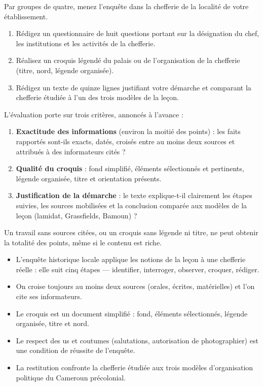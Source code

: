 \documentclass[11pt]{article}
\begin{document}
\begin{exercice}
Par groupes de quatre, menez l'enquête dans la chefferie de la localité de votre établissement.
\begin{enumerate}
\item Rédigez un questionnaire de huit questions portant sur la désignation du chef, les institutions et les activités de la chefferie.
\item Réalisez un croquis légendé du palais ou de l'organisation de la chefferie (titre, nord, légende organisée).
\item Rédigez un texte de quinze lignes justifiant votre démarche et comparant la chefferie étudiée à l'un des trois modèles de la leçon.
\end{enumerate}
\end{exercice}

\begin{corrige}
L'évaluation porte sur trois critères, annoncés à l'avance :
\begin{enumerate}
\item \textbf{Exactitude des informations} (environ la moitié des points) : les faits rapportés sont-ils exacts, datés, croisés entre au moins deux sources et attribués à des informateurs cités ?
\item \textbf{Qualité du croquis} : fond simplifié, éléments sélectionnés et pertinents, légende organisée, titre et orientation présents.
\item \textbf{Justification de la démarche} : le texte explique-t-il clairement les étapes suivies, les sources mobilisées et la conclusion comparée aux modèles de la leçon (lamidat, Grassfields, Bamoun) ?
\end{enumerate}
Un travail sans sources citées, ou un croquis sans légende ni titre, ne peut obtenir la totalité des points, même si le contenu est riche.
\end{corrige}

\begin{aretenir}[L'essentiel du TD]
\begin{itemize}
\item L'enquête historique locale applique les notions de la leçon à une chefferie réelle : elle suit cinq étapes — identifier, interroger, observer, croquer, rédiger.
\item On croise toujours au moins deux sources (orales, écrites, matérielles) et l'on cite ses informateurs.
\item Le croquis est un document simplifié : fond, éléments sélectionnés, légende organisée, titre et nord.
\item Le respect des us et coutumes (salutations, autorisation de photographier) est une condition de réussite de l'enquête.
\item La restitution confronte la chefferie étudiée aux trois modèles d'organisation politique du Cameroun précolonial.
\end{itemize}
\end{aretenir}
\end{document}
